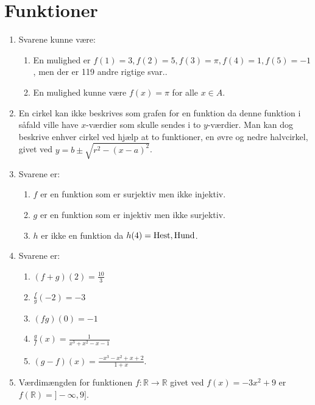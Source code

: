 \newpage
\section{Funktioner}
\begin{enumerate}
	\item  Svarene kunne være:
	\begin{enumerate}
		\item En mulighed er $ f(1)=3,f(2)=5,f(3)=\pi,f(4)=1,f(5)=-1 $, men der er 119 andre rigtige svar..
		\item En mulighed kunne være $f(x)=\pi$ for alle $x\in A$.
	\end{enumerate}
	
	
	\item En cirkel kan ikke beskrives som grafen for en funktion da denne funktion i såfald ville have $x$-værdier som skulle sendes i to $y$-værdier. Man kan dog beskrive enhver cirkel ved hjælp at to funktioner, en øvre og nedre halvcirkel, givet ved $y=b\pm \sqrt{r^2-(x-a)^2}$. 
	
	\item Svarene er:
	\begin{enumerate}
		\item $f$ er en funktion som er surjektiv men ikke injektiv.
		\item $g$ er en funktion som er injektiv men ikke surjektiv.
		\item $h$ er ikke en funktion da $h(4)=\textup{Hest},\textup{Hund}$.
	\end{enumerate}

	\item Svarene er:
	\begin{enumerate}
		\item $(f+g)(2)=\frac{10}{3}$
		\item $ \frac{f}{g}(-2) =-3$
		\item $(fg)(0)=-1$
		\item $\frac{g}{f}(x)=\frac{1}{x^3+x^2-x-1}$
		\item $(g-f)(x)=\frac{-x^3-x^2+x+2}{1+x}$.
	\end{enumerate}

	\item Værdimængden for funktionen $f\colon \mathbb{R}\to \mathbb{R}$ givet ved $f(x)=-3x^2+9$ er $f(\mathbb{R})=]-\infty,9]$.
	

\end{enumerate}
